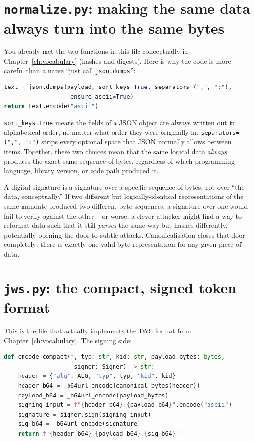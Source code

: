 \documentclass[11pt]{report}
\newcommand{\file}[1]{\texttt{#1}}
\newcommand{\code}[1]{\texttt{#1}}
\begin{document}
\section{\file{normalize.py}: making the same data always turn into the same bytes}

You already met the two functions in this file conceptually in
Chapter~\ref{ch:vocabulary} (hashes and digests). Here is why the code is
more careful than a naive ``just call \code{json.dumps}'':

\begin{lstlisting}[language=Python]
text = json.dumps(payload, sort_keys=True, separators=(",", ":"),
                   ensure_ascii=True)
return text.encode("ascii")
\end{lstlisting}

\code{sort\_keys=True} means the fields of a JSON object are always
written out in alphabetical order, no matter what order they were
originally in. \code{separators=(",", ":")} strips every optional space
that JSON normally allows between items. Together, these two choices mean
that the same logical data \emph{always} produces the exact same
sequence of bytes, regardless of which programming language, library
version, or code path produced it.

\begin{whyitmatters}
A digital signature is a signature over a specific sequence of bytes, not
over ``the data, conceptually.'' If two different but logically-identical
representations of the same mandate produced two different byte
sequences, a signature over one would fail to verify against the other --
or worse, a clever attacker might find a way to reformat data such that
it still \emph{parses} the same way but hashes differently, potentially
opening the door to subtle attacks. Canonicalisation closes that door
completely: there is exactly one valid byte representation for any given
piece of data.
\end{whyitmatters}

\section{\file{jws.py}: the compact, signed token format}

This is the file that actually implements the JWS format from
Chapter~\ref{ch:vocabulary}. The signing side:

\begin{lstlisting}[language=Python]
def encode_compact(*, typ: str, kid: str, payload_bytes: bytes,
                    signer: Signer) -> str:
    header = {"alg": ALG, "typ": typ, "kid": kid}
    header_b64 = _b64url_encode(canonical_bytes(header))
    payload_b64 = _b64url_encode(payload_bytes)
    signing_input = f"{header_b64}.{payload_b64}".encode("ascii")
    signature = signer.sign(signing_input)
    sig_b64 = _b64url_encode(signature)
    return f"{header_b64}.{payload_b64}.{sig_b64}"
\end{lstlisting}
\end{document}
